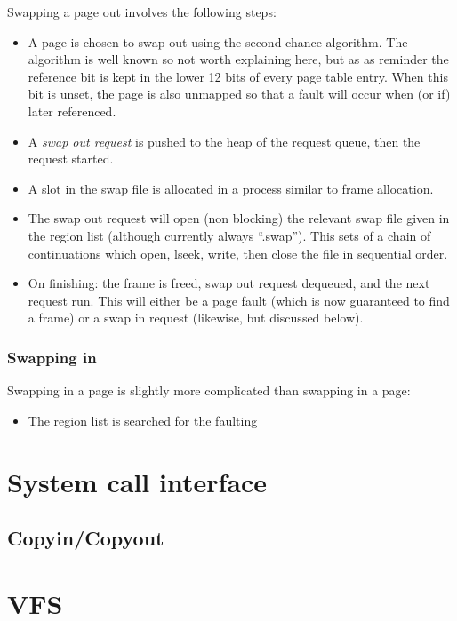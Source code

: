 \documentclass[12pt,english]{article}
\begin{document}
Swapping a page out involves the following steps:
\begin{itemize}
\item A page is chosen to swap out using the second chance algorithm.  The algorithm is well known so not worth explaining here, but as as reminder the reference bit is kept in the lower 12 bits of every page table entry.  When this bit is unset, the page is also unmapped so that a fault will occur when (or if) later referenced.
\item A \emph{swap out request} is pushed to the heap of the request queue, then the request started.
\item A slot in the swap file is allocated in a process similar to frame allocation.
\item The swap out request will open (non blocking) the relevant swap file given in the region list (although currently always ``.swap'').  This sets of a chain of continuations which open, lseek, write, then close the file in sequential order.
\item On finishing: the frame is freed, swap out request dequeued, and the next request run.  This will either be a page fault (which is now guaranteed to find a frame) or a swap in request (likewise, but discussed below).
\end{itemize}

\subsubsection{Swapping in}

Swapping in a page is slightly more complicated than swapping in a page:
\begin{itemize}
\item The region list is searched for the faulting 
\end{itemize}


\section{System call interface}

\subsection{Copyin/Copyout}


\section{VFS}
\end{document}
